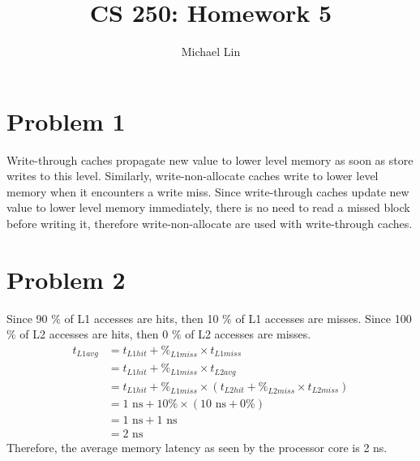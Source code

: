 \documentclass{article}
\title{CS 250: Homework 5}
\author{Michael Lin}
\begin{document}
\maketitle
\section*{Problem 1}
Write-through caches propagate new value to lower level memory as soon as store writes to this level. Similarly, write-non-allocate caches write to lower level memory when it encounters a write miss. Since write-through caches update new value to lower level memory immediately, there is no need to read a missed block before writing it, therefore write-non-allocate are used with write-through caches.

\section*{Problem 2}
Since 90 $\%$ of L1 accesses are hits, then 10 $\%$ of L1 accesses are misses. Since 100 $\%$ of L2 accesses are hits, then 0 $\%$ of L2 accesses are misses. 
\begin{align*}
t_{L1 avg} &= t_{L1 hit} + \%_{L1 miss}\times t_{L1 miss} \\
&= t_{L1 hit} + \%_{L1 miss}\times t_{L2 avg} \\
&= t_{L1 hit} + \%_{L1 miss}\times (t_{L2 hit} + \%_{L2 miss}\times t_{L2 miss})\\
&= 1 \text{ ns} + 10 \% \times (10\text{ ns} + 0 \%) \\
&= 1 \text{ ns} + 1\text{ ns} \\
&= 2\text{ ns}
\end{align*}
Therefore, the average memory latency as seen by the processor core is 2 ns.
\end{document}
